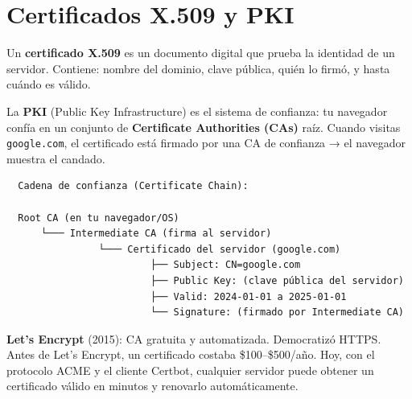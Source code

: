 \section{ Certificados X.509 y PKI}

\begin{concepto}
Un \textbf{certificado X.509} es un documento digital que prueba la identidad
de un servidor. Contiene: nombre del dominio, clave pública, quién lo firmó,
y hasta cuándo es válido.

La \textbf{PKI} (Public Key Infrastructure) es el sistema de confianza:
tu navegador confía en un conjunto de \textbf{Certificate Authorities (CAs)}
raíz. Cuando visitas \texttt{google.com}, el certificado está firmado por
una CA de confianza → el navegador muestra el candado.
\end{concepto}

\begin{lstlisting}
  Cadena de confianza (Certificate Chain):

  Root CA (en tu navegador/OS)
      └─── Intermediate CA (firma al servidor)
                └─── Certificado del servidor (google.com)
                         ├── Subject: CN=google.com
                         ├── Public Key: (clave pública del servidor)
                         ├── Valid: 2024-01-01 a 2025-01-01
                         └── Signature: (firmado por Intermediate CA)
\end{lstlisting}

\begin{ejemplo}
\textbf{Let's Encrypt} (2015): CA gratuita y automatizada. Democratizó HTTPS.
Antes de Let's Encrypt, un certificado costaba \$100--\$500/año. Hoy, con el
protocolo ACME y el cliente Certbot, cualquier servidor puede obtener
un certificado válido en minutos y renovarlo automáticamente.
\end{ejemplo}
